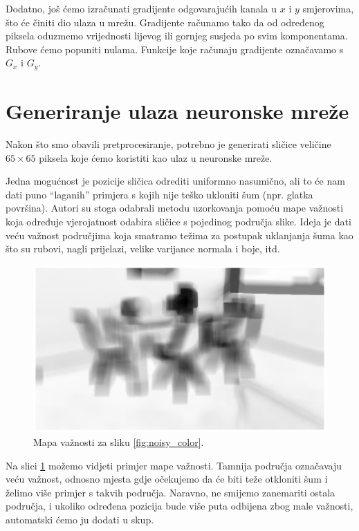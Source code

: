 \documentclass[times, utf8, seminar, numeric]{fer}
\begin{document}
Dodatno, još ćemo izračunati gradijente odgovarajućih kanala u $x$ i $y$ smjerovima, što će
činiti dio ulaza u mrežu. Gradijente računamo tako da od određenog piksela oduzmemo vrijednosti
lijevog ili gornjeg susjeda po svim komponentama. Rubove ćemo popuniti nulama. Funkcije koje
računaju gradijente označavamo s $G_x$ i $G_y$.

\section{Generiranje ulaza neuronske mreže}
Nakon što smo obavili pretprocesiranje, potrebno je generirati sličice  veličine $65\times65$ piksela koje ćemo koristiti kao ulaz u neuronske mreže.

Jedna mogućnost je pozicije sličica odrediti uniformno nasumično, ali to će nam dati puno
``laganih'' primjera s kojih nije teško ukloniti šum (npr. glatka površina). Autori su stoga
odabrali metodu uzorkovanja pomoću mape važnosti  koja određuje vjerojatnost
odabira sličice s pojedinog područja slike. Ideja je dati veću važnost područjima koja smatramo
težima za postupak uklanjanja šuma kao što su rubovi, nagli prijelazi, velike varijance normala i
boje, itd.

\begin{figure}[h]
\centering
\includegraphics[width=\textwidth]{impmap.png}
\caption{Mapa važnosti za sliku \ref{fig:noisy_color}.}
\label{fig:importance_map}
\end{figure}

Na slici \ref{fig:importance_map} možemo vidjeti primjer mape važnosti. Tamnija područja
označavaju veću važnost, odnosno mjesta gdje očekujemo da će biti teže otkloniti šum i želimo
više primjer s takvih područja. Naravno, ne smijemo zanemariti ostala područja, i ukoliko
određena pozicija bude više puta odbijena zbog male važnosti, automatski ćemo ju dodati u skup.
\end{document}
